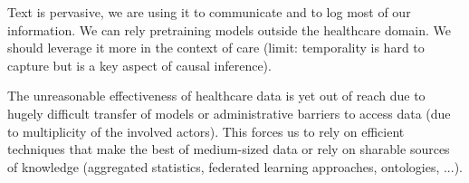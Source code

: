 \documentclass{report}
\begin{document}
Text is pervasive, we are using it to communicate and to log most of our
information. We can rely pretraining models outside the healthcare domain. We
should leverage it more in the context of care (limit: temporality is hard to
capture but is a key aspect of causal inference).

The unreasonable effectiveness of healthcare data is yet out of reach due to
hugely difficult transfer of models or administrative barriers to access data
(due to multiplicity of the involved actors). This forces us to rely on
efficient techniques that make the best of medium-sized data or rely on sharable
sources of knowledge (aggregated statistics, federated learning approaches,
ontologies, ...).

\printbibliography
\end{document}
